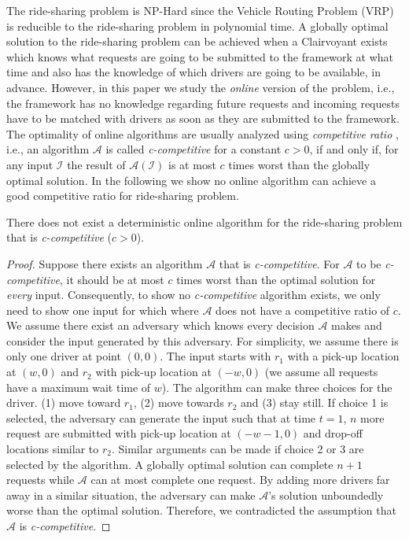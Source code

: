 The ride-sharing problem is NP-Hard since the Vehicle Routing Problem (VRP) \cite{Dantzig59} is reducible to the ride-sharing problem in polynomial time. A globally optimal solution to the ride-sharing problem can be achieved when a Clairvoyant exists which knows what requests are going to be submitted to the framework at what time and also has the knowledge of which drivers are going to be available, in advance. However, in this paper we study the \textit{online} version of the problem, i.e., the framework has no knowledge regarding future requests and incoming requests have to be matched with drivers as soon as they are submitted to the framework. The optimality of online algorithms are usually analyzed using \textit{competitive ratio} \cite{Sleator85}, i.e., an algorithm $\mathcal{A}$ is called \textit{c-competitive} for a constant $c > 0$, if and only if, for any input $\mathcal{I}$ the result of $\mathcal{A}(\mathcal{I})$ is at most $c$ times worst than the globally optimal solution. In the following we show no online algorithm can achieve a good competitive ratio for ride-sharing problem.

\begin{theorem}
\label{th:comp_ratio}
There does not exist a deterministic online algorithm for the ride-sharing problem that is \textit{c-competitive} ($c > 0$). 
\end{theorem}

\begin{proof}
Suppose there exists an algorithm $\mathcal{A}$ that is \textit{c-competitive}. For $\mathcal{A}$ to be \textit{c-competitive}, it should be at most $c$ times worst than the optimal solution for \textit{every} input. Consequently, to show no \textit{c-competitive} algorithm exists, we only need to show one input for which where $\mathcal{A}$ does not have a competitive ratio of $c$.\\
We assume there exist an adversary which knows every decision $\mathcal{A}$ makes and consider the input generated by this adversary. For simplicity, we assume there is only one driver at point $(0, 0)$. The input starts with $r_1$ with a pick-up location at $(w, 0)$ and $r_2$ with pick-up location at $(-w, 0)$ (we assume all requests have a maximum wait time of $w$). The algorithm can make three choices for the driver. (1) move toward $r_1$, (2) move towards $r_2$ and (3) stay still. If choice 1 is selected, the adversary can generate the input such that at time $t = 1$, $n$ more request are submitted with pick-up location at $(-w-1, 0)$ and drop-off locations similar to $r_2$. Similar arguments can be made if choice 2 or 3 are selected by the algorithm. A globally optimal solution can complete $n+1$ requests while $\mathcal{A}$ can at most complete one request. By adding more drivers far away in a similar situation, the adversary can make $\mathcal{A}$'s solution unboundedly worse than the optimal solution. Therefore, we contradicted the assumption that $\mathcal{A}$ is \textit{c-competitive}.
\end{proof}



